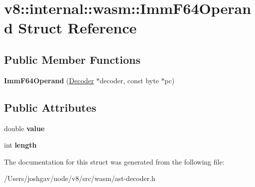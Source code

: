 \hypertarget{structv8_1_1internal_1_1wasm_1_1_imm_f64_operand}{}\section{v8\+:\+:internal\+:\+:wasm\+:\+:Imm\+F64\+Operand Struct Reference}
\label{structv8_1_1internal_1_1wasm_1_1_imm_f64_operand}
\subsection*{Public Member Functions}
\begin{DoxyCompactItemize}
\item 
{\bfseries Imm\+F64\+Operand} (\hyperlink{classv8_1_1internal_1_1wasm_1_1_decoder}{Decoder} $\ast$decoder, const byte $\ast$pc)\hypertarget{structv8_1_1internal_1_1wasm_1_1_imm_f64_operand_aca58147f98332d070bcaac4491b991d4}{}\label{structv8_1_1internal_1_1wasm_1_1_imm_f64_operand_aca58147f98332d070bcaac4491b991d4}

\end{DoxyCompactItemize}
\subsection*{Public Attributes}
\begin{DoxyCompactItemize}
\item 
double {\bfseries value}\hypertarget{structv8_1_1internal_1_1wasm_1_1_imm_f64_operand_a3fb26488d3679afdb483a07ab0fc23ac}{}\label{structv8_1_1internal_1_1wasm_1_1_imm_f64_operand_a3fb26488d3679afdb483a07ab0fc23ac}

\item 
int {\bfseries length}\hypertarget{structv8_1_1internal_1_1wasm_1_1_imm_f64_operand_ac22c3da56849d8e8ad479948cb7f1a5b}{}\label{structv8_1_1internal_1_1wasm_1_1_imm_f64_operand_ac22c3da56849d8e8ad479948cb7f1a5b}

\end{DoxyCompactItemize}


The documentation for this struct was generated from the following file\+:\begin{DoxyCompactItemize}
\item 
/\+Users/joshgav/node/v8/src/wasm/ast-\/decoder.\+h\end{DoxyCompactItemize}
